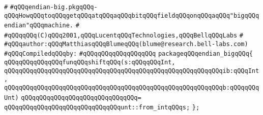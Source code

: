 \label{src/app/c-glue-maker/endian-big.pkg}
\verb|#|\newline
\verb|#qQQqendian-big.pkgqQQq-qQQqHowqQQqtoqQQqgetqQQqatqQQqaqQQqbitqQQqfieldqQQqonqQQqaqQQq"bigqQQqendian"qQQqmachine.|\newline
\verb|#|\newline
\verb|#qQQqqQQq(C)qQQq2001,qQQqLucentqQQqTechnologies,qQQqBellqQQqLabs|\newline
\verb|#|\newline
\verb|#qQQqauthor:qQQqMatthiasqQQqBlumeqQQq(blume@research.bell-labs.com)|\newline
\newline
\verb|#qQQqCompiledqQQqby:|\newline
\verb|#qQQqqQQqqQQqqQQqqQQq|\newline
\newline
\verb|packageqQQqendian_bigqQQq{|\newline
\newline
\verb|qQQqqQQqqQQqqQQqfunqQQqshiftqQQq(s:qQQqqQQqInt,|\newline
\verb|qQQqqQQqqQQqqQQqqQQqqQQqqQQqqQQqqQQqqQQqqQQqqQQqqQQqqQQqqQQqib:qQQqInt,|\newline
\verb|qQQqqQQqqQQqqQQqqQQqqQQqqQQqqQQqqQQqqQQqqQQqqQQqqQQqqQQqqQQqb:qQQqqQQqUnt)|\newline
\verb|qQQqqQQqqQQqqQQqqQQqqQQqqQQqqQQq=|\newline
\verb|qQQqqQQqqQQqqQQqqQQqqQQqqQQqqQQqunt::from_intqQQqs;|\newline
\verb|};|\newline

